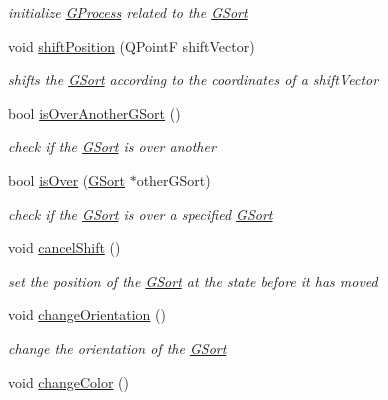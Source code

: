 \begin{DoxyCompactItemize}
\begin{DoxyCompactList}\small\item\em initialize \hyperlink{classGProcess}{G\+Process} related to the \hyperlink{classGSort}{G\+Sort} \end{DoxyCompactList}\item 
void \hyperlink{classGSort_a74c3c052d111d72784b6ad286ff219b2}{shift\+Position} (Q\+Point\+F shift\+Vector)
\begin{DoxyCompactList}\small\item\em shifts the \hyperlink{classGSort}{G\+Sort} according to the coordinates of a shift\+Vector \end{DoxyCompactList}\item 
bool \hyperlink{classGSort_a43f637ea0c82b59fdda78380f3e46608}{is\+Over\+Another\+G\+Sort} ()
\begin{DoxyCompactList}\small\item\em check if the \hyperlink{classGSort}{G\+Sort} is over another \end{DoxyCompactList}\item 
bool \hyperlink{classGSort_a417e8b227cfb23393b44dc3b75204dbd}{is\+Over} (\hyperlink{classGSort}{G\+Sort} $\ast$other\+G\+Sort)
\begin{DoxyCompactList}\small\item\em check if the \hyperlink{classGSort}{G\+Sort} is over a specified \hyperlink{classGSort}{G\+Sort} \end{DoxyCompactList}\item 
\hypertarget{classGSort_afe21929462477faeaf61dc705e5225f0}{void \hyperlink{classGSort_afe21929462477faeaf61dc705e5225f0}{cancel\+Shift} ()}\label{classGSort_afe21929462477faeaf61dc705e5225f0}

\begin{DoxyCompactList}\small\item\em set the position of the \hyperlink{classGSort}{G\+Sort} at the state before it has moved \end{DoxyCompactList}\item 
\hypertarget{classGSort_af6e2d5c0135d55f8a152ba58fc20f9f2}{void \hyperlink{classGSort_af6e2d5c0135d55f8a152ba58fc20f9f2}{change\+Orientation} ()}\label{classGSort_af6e2d5c0135d55f8a152ba58fc20f9f2}

\begin{DoxyCompactList}\small\item\em change the orientation of the \hyperlink{classGSort}{G\+Sort} \end{DoxyCompactList}\item 
\hypertarget{classGSort_aa4c1345a701c975b34de5405bf4d1ab8}{void \hyperlink{classGSort_aa4c1345a701c975b34de5405bf4d1ab8}{change\+Color} ()}\label{classGSort_aa4c1345a701c975b34de5405bf4d1ab8}


\end{DoxyCompactItemize}
